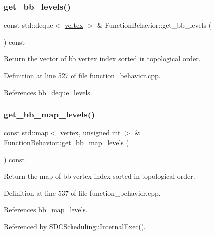 \subsubsection{\texorpdfstring{get\+\_\+bb\+\_\+levels()}{get\_bb\_levels()}}
{\footnotesize\ttfamily const std\+::deque$<$ \hyperlink{graph_8hpp_abefdcf0544e601805af44eca032cca14}{vertex} $>$ \& Function\+Behavior\+::get\+\_\+bb\+\_\+levels (\begin{DoxyParamCaption}{ }\end{DoxyParamCaption}) const}



Return the vector of bb vertex index sorted in topological order. 



Definition at line 527 of file function\+\_\+behavior.\+cpp.



References bb\+\_\+deque\+\_\+levels.

\mbox{\label{classFunctionBehavior_afe9b9b0f9c7be3f3808bf34e0050b7f3}} 
\subsubsection{\texorpdfstring{get\+\_\+bb\+\_\+map\+\_\+levels()}{get\_bb\_map\_levels()}}
{\footnotesize\ttfamily const std\+::map$<$ \hyperlink{graph_8hpp_abefdcf0544e601805af44eca032cca14}{vertex}, unsigned int $>$ \& Function\+Behavior\+::get\+\_\+bb\+\_\+map\+\_\+levels (\begin{DoxyParamCaption}{ }\end{DoxyParamCaption}) const}



Return the map of bb vertex index sorted in topological order. 



Definition at line 537 of file function\+\_\+behavior.\+cpp.



References bb\+\_\+map\+\_\+levels.



Referenced by S\+D\+C\+Scheduling\+::\+Internal\+Exec().

